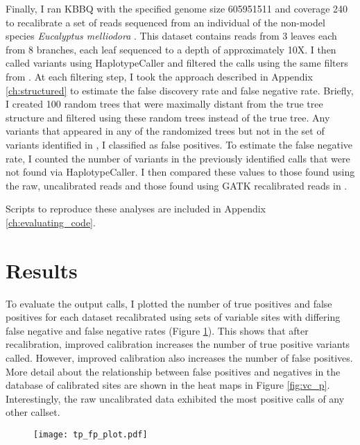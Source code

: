 Finally, I ran KBBQ with the specified genome size 605951511 and coverage 240 to recalibrate a set of reads sequenced from an individual of the non-model species \textit{Eucalyptus melliodora} \parencite{orr_phylogenomic_2020}. This dataset contains reads from 3 leaves each from 8 branches, each leaf sequenced to a depth of approximately 10X. I then called variants using HaplotypeCaller and filtered the calls using the same filters from \cite{orr_phylogenomic_2020}. At each filtering step, I took the approach described in Appendix \ref{ch:structured} to estimate the false discovery rate and false negative rate. Briefly, I created 100 random trees that were maximally distant from the true tree structure and filtered using these random trees instead of the true tree. Any variants that appeared in any of the randomized trees but not in the set of variants identified in \cite{orr_phylogenomic_2020}, I classified as false positives. To estimate the false negative rate, I counted the number of variants in the previously identified calls that were not found via HaplotypeCaller. I then compared these values to those found using the raw, uncalibrated reads and those found using GATK recalibrated reads in \cite{orr_phylogenomic_2020}.

Scripts to reproduce these analyses are included in Appendix \ref{ch:evaluating_code}.

\section{Results}

To evaluate the output calls, I plotted the number of true positives and false positives for each dataset recalibrated using sets of variable sites with differing false negative and false negative rates (Figure \ref{fig:vc_fptp}). This shows that after recalibration, improved calibration increases the number of true positive variants called. However, improved calibration also increases the number of false positives. More detail about the relationship between false positives and negatives in the database of calibrated sites are shown in the heat maps in Figure \ref{fig:vc_p}. Interestingly, the raw uncalibrated data exhibited the most positive calls of any other callset.


\begin{figure}
\centering
\texttt{[image: tp\_fp\_plot.pdf]}
\label{fig:vc_fptp}
\end{figure}

